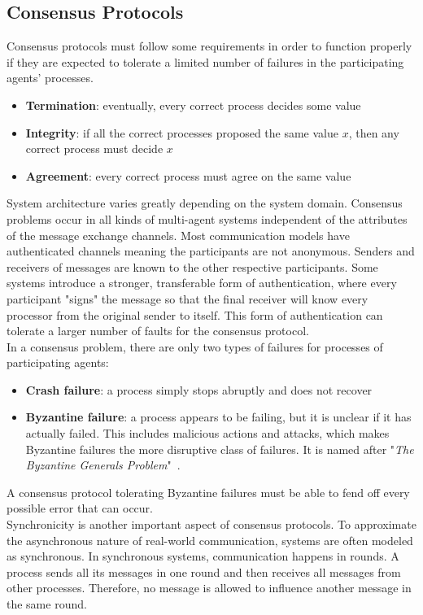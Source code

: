 \subsection{Consensus Protocols}
Consensus protocols must follow some requirements in order to function properly if they are expected to tolerate a limited number of failures in the participating agents' processes.
\begin{itemize}
	\item \textbf{Termination}: eventually, every correct process decides some value
	\item \textbf{Integrity}: if all the correct processes proposed the same value $x$, then any correct process must decide $x$
	\item \textbf{Agreement}: every correct process must agree on the same value
\end{itemize}
System architecture varies greatly depending on the system domain. Consensus problems occur in all kinds of multi-agent systems independent of the attributes of the message exchange channels. Most communication models have authenticated channels meaning the participants are not anonymous. Senders and receivers of messages are known to the other respective participants. Some systems introduce a stronger, transferable form of authentication, where every participant "signs" the message so that the final receiver will know every processor from the original sender to itself. This form of authentication can tolerate a larger number of faults for the consensus protocol.~\cite{Coulouris2001}\\
In a consensus problem, there are only two types of failures for processes of participating agents:
\begin{itemize}
	\item \textbf{Crash failure}: a process simply stops abruptly and does not recover
	\item \textbf{Byzantine failure}: a process appears to be failing, but it is unclear if it has actually failed. This includes malicious actions and attacks, which makes Byzantine failures the more disruptive class of failures. It is named after "\textit{The Byzantine Generals Problem}"~\cite{Lamport1982}.
\end{itemize}
A consensus protocol tolerating Byzantine failures must be able to fend off every possible error that can occur.~\cite{Coulouris2001}\\
Synchronicity is another important aspect of consensus protocols. To approximate the asynchronous nature of real-world communication, systems are often modeled as synchronous. In synchronous systems, communication happens in rounds. A process sends all its messages in one round and then receives all messages from other processes. Therefore, no message is allowed to influence another message in the same round.~\cite{Coulouris2001}\\
